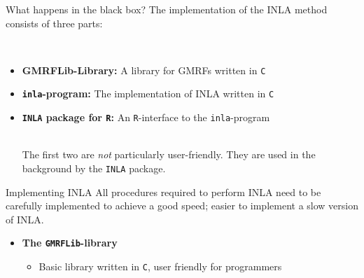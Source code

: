 \documentclass[
  ignorenonframetext,
]{beamer}
\providecommand{\tightlist}{%
  \setlength{\itemsep}{0pt}\setlength{\parskip}{0pt}}
\begin{document}
\begin{frame}[fragile]{What happens in the black box?}
\protect\hypertarget{what-happens-in-the-black-box}{}
The implementation of the INLA method consists of three parts:\\
\strut \\

\begin{itemize}
\item
  \textbf{GMRFLib-Library:} A library for GMRFs written in \texttt{C}
\item
  \textbf{\texttt{inla}-program:} The implementation of INLA written in
  \texttt{C}
\item
  \textbf{\texttt{INLA} package for \texttt{R}:} An \texttt{R}-interface
  to the \texttt{inla}-program\\
  \strut \\
  The first two are \emph{not} particularly user-friendly. They are used
  in the background by the \texttt{INLA} package.
\end{itemize}
\end{frame}

\begin{frame}[fragile]{Implementing INLA}
\protect\hypertarget{implementing-inla}{}
All procedures required to perform INLA need to be carefully implemented
to achieve a good speed; easier to implement a slow version of INLA.

\pause

\begin{itemize}
\item
  \textbf{The \texttt{GMRFLib}-library}

  \begin{itemize}
  \tightlist
  \item
    Basic library written in \texttt{C}, user friendly for programmers
  \end{itemize}
\end{itemize}
\end{frame}
\end{document}

